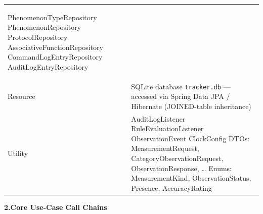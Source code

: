 \documentclass[9pt]{article}
\begin{document}
{\begin{tabularx}{\linewidth}{@{}
    >{\bfseries\raggedright\arraybackslash}p{2.6cm}
    >{\raggedright\arraybackslash}X
  @{}}
  PhenomenonTypeRepository \textbullet{} PhenomenonRepository \textbullet{}
  ProtocolRepository \textbullet{} AssociativeFunctionRepository \textbullet{}
  CommandLogEntryRepository \textbullet{} AuditLogEntryRepository \\[2pt]
Resource &
  SQLite database \texttt{tracker.db} — accessed via Spring Data JPA / Hibernate (JOINED-table inheritance) \\[2pt]
Utility &
  AuditLogListener \textbullet{} RuleEvaluationListener \textbullet{} ObservationEvent \textbullet{}
  ClockConfig \textbullet{}
  DTOs: MeasurementRequest, CategoryObservationRequest, ObservationResponse, \ldots\textbullet{}
  Enums: MeasurementKind, ObservationStatus, Presence, AccuracyRating \\[2pt]
\bottomrule
\end{tabularx}
}

\vspace{6pt}

{\small\bfseries 2.\enspace Core Use-Case Call Chains}
\vspace{3pt}
\end{document}
